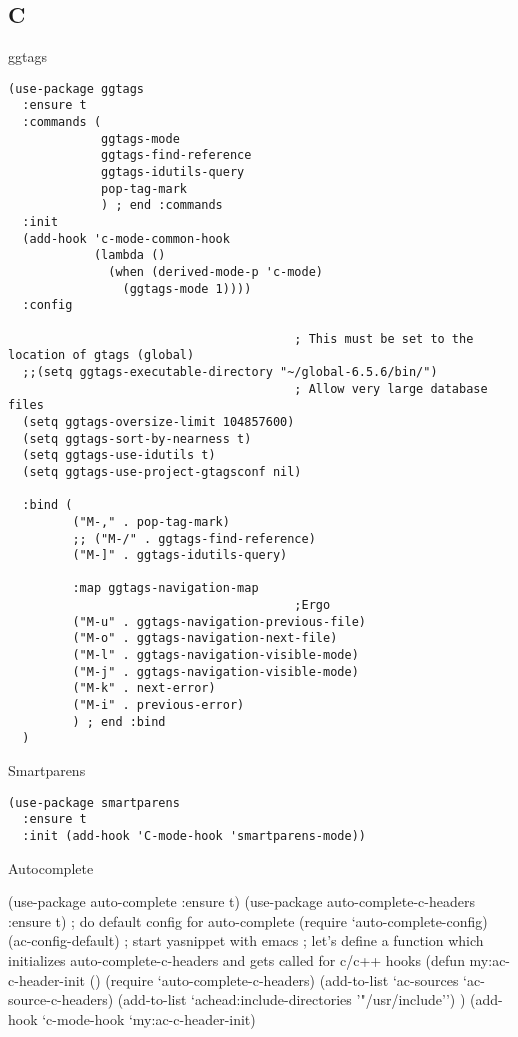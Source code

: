 \documentclass[12pt]{article}
\begin{document}
\subsection{C}
\label{sec-7-6}
ggtags

\lstset{language=Lisp,label= ,caption= ,numbers=none}
\begin{lstlisting}
(use-package ggtags
  :ensure t
  :commands (
             ggtags-mode
             ggtags-find-reference
             ggtags-idutils-query
             pop-tag-mark
             ) ; end :commands
  :init
  (add-hook 'c-mode-common-hook
            (lambda ()
              (when (derived-mode-p 'c-mode)
                (ggtags-mode 1))))
  :config

                                        ; This must be set to the location of gtags (global)
  ;;(setq ggtags-executable-directory "~/global-6.5.6/bin/")
                                        ; Allow very large database files
  (setq ggtags-oversize-limit 104857600)
  (setq ggtags-sort-by-nearness t)
  (setq ggtags-use-idutils t)
  (setq ggtags-use-project-gtagsconf nil)

  :bind (
         ("M-," . pop-tag-mark)
         ;; ("M-/" . ggtags-find-reference)
         ("M-]" . ggtags-idutils-query)

         :map ggtags-navigation-map
                                        ;Ergo
         ("M-u" . ggtags-navigation-previous-file)
         ("M-o" . ggtags-navigation-next-file)
         ("M-l" . ggtags-navigation-visible-mode)
         ("M-j" . ggtags-navigation-visible-mode)
         ("M-k" . next-error)
         ("M-i" . previous-error)
         ) ; end :bind
  )
\end{lstlisting}
Smartparens
\lstset{language=Lisp,label= ,caption= ,numbers=none}
\begin{lstlisting}
(use-package smartparens
  :ensure t
  :init (add-hook 'C-mode-hook 'smartparens-mode))
\end{lstlisting}

Autocomplete 


(use-package auto-complete
:ensure t)
(use-package auto-complete-c-headers
:ensure t)
; do default config for auto-complete
(require `auto-complete-config)
(ac-config-default)
; start yasnippet with emacs
; let's define a function which initializes auto-complete-c-headers and gets called for c/c++ hooks
(defun my:ac-c-header-init ()
(require `auto-complete-c-headers)
(add-to-list `ac-sources `ac-source-c-headers)
(add-to-list `achead:include-directories '"/usr/include'')
)
(add-hook `c-mode-hook `my:ac-c-header-init)
\end{document}
